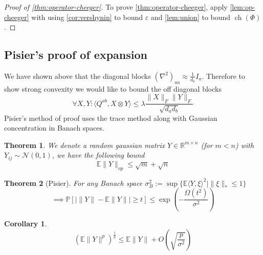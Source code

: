 \documentclass{article}
\newtheorem{theorem}{Theorem}
\newtheorem{corollary}{Corollary}
\newcommand{\R}{{\mathbb{R}}}
\newcommand{\ch}{\operatorname{ch}}
\newcommand{\E}{\mathbb{E}}
\renewcommand{\Pr}{\mathbb{P}}
\newcommand\eps{\varepsilon}
\begin{document}
\begin{proof}[Proof of \cref{thm:operator-cheeger}]
To prove \cref{thm:operator-cheeger}, apply \cref{lem:op-cheeger} with using \cref{cor:vershynin} to bound $\eps$ and \cref{lem:union} to bound $\ch(\Phi)$.
\end{proof}

\subsection{Pisier's proof of expansion}
We have shown above that the diagonal blocks $(\nabla^{2})_{aa} \approx \frac{1}{d_{a}} I_{a}$. Therefore to show strong convexity we would like to bound the off diagonal blocks 
\[ \forall X,Y:  \langle Q^{ab}, X \otimes Y \rangle \leq \lambda \frac{\|X\|_{F} \|Y\|_{F}}{\sqrt{d_{a} d_{b}}}   \]
Pisier's method of proof uses the trace method along with Gaussian concentration in Banach spaces. 

\begin{theorem}
We denote a random gaussian matrix $Y \in \R^{m \times n}$ (for $m < n$) with $Y_{ij} \sim \mathcal{N}(0,1)$, we have the following bound
\[ \E \|Y\|_{op} \leq \sqrt{m} + \sqrt{n} \]
\end{theorem}

% 

\begin{theorem} [Pisier]
For any Banach space $\sigma_{B}^{2} := \sup \{ \E \langle Y, \xi \rangle^{2} \mid \|\xi\|_{*} \leq 1 \} $
\[ \implies \Pr [ | \|Y\| - \E \|Y\| | \geq t ] \leq \exp \left( - \frac{\Omega(t^{2})}{\sigma^{2}} \right)   \]
\end{theorem}

\begin{corollary}
\[ (\E \|Y\|^{p})^{\frac{1}{p}} \leq \E \|Y\| + O \left( \sqrt{\frac{p}{\sigma^{2}}} \right)   \]
\end{corollary}
\end{document}
